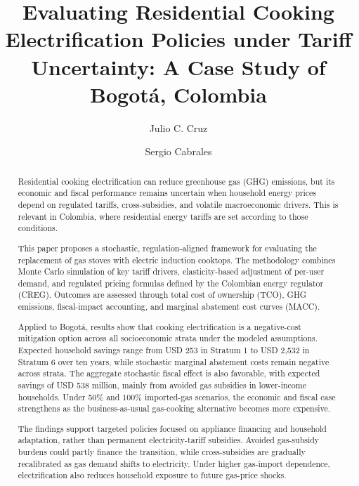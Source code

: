 \documentclass[authoryear,preprint,review,10pt]{elsarticle}
\begin{document}
\begin{frontmatter}

\title{Evaluating Residential Cooking Electrification Policies under Tariff Uncertainty: A Case Study of Bogotá, Colombia}

\author[label1]{Julio C. Cruz}
\address[label1]{Department of Industrial Engineering, University of Los Andes,  Cra 1 Este No 19A-40, Bogot\'a, Colombia}

\author[label1]{Sergio Cabrales}

\begin{abstract}
Residential cooking electrification can reduce greenhouse gas (GHG) emissions, but its economic and fiscal performance remains uncertain when household energy prices depend on regulated tariffs, cross-subsidies, and volatile macroeconomic drivers. This is relevant in Colombia, where residential energy tariffs are set according to those conditions.

This paper proposes a stochastic, regulation-aligned framework for evaluating the replacement of gas stoves with electric induction cooktops. The methodology combines Monte Carlo simulation of key tariff drivers, elasticity-based adjustment of per-user demand, and regulated pricing formulas defined by the Colombian energy regulator (CREG). Outcomes are assessed through total cost of ownership (TCO), GHG emissions, fiscal-impact accounting, and marginal abatement cost curves (MACC).

Applied to Bogotá, results show that cooking electrification is a negative-cost mitigation option across all socioeconomic strata under the modeled assumptions. Expected household savings range from USD 253 in Stratum 1 to USD 2,532 in Stratum 6 over ten years, while stochastic marginal abatement costs remain negative across strata. The aggregate stochastic fiscal effect is also favorable, with expected savings of USD 538 million, mainly from avoided gas subsidies in lower-income households. Under 50\% and 100\% imported-gas scenarios, the economic and fiscal case strengthens as the business-as-usual gas-cooking alternative becomes more expensive.

The findings support targeted policies focused on appliance financing and household adaptation, rather than permanent electricity-tariff subsidies. Avoided gas-subsidy burdens could partly finance the transition, while cross-subsidies are gradually recalibrated as gas demand shifts to electricity. Under higher gas-import dependence, electrification also reduces household exposure to future gas-price shocks.
\end{abstract}


\end{frontmatter}
\end{document}
